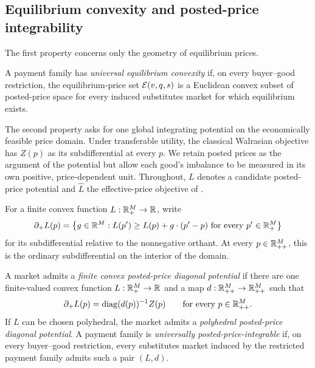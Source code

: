 \subsection{Equilibrium convexity and posted-price integrability}\label{subsec:two-notions}

The first property concerns only the geometry of equilibrium prices.

\begin{definition}\label{def:eq-convexity}
A payment family has \emph{universal equilibrium convexity} if, on every buyer--good restriction, the equilibrium-price set $\mathcal{E}(v,q,s)$ is a Euclidean convex subset of posted-price space for every induced substitutes market for which equilibrium exists.
\end{definition}

The second property asks for one global integrating potential on the economically feasible price domain. Under transferable utility, the classical Walrasian objective has $Z(p)$ as its subdifferential at every $p$. We retain posted prices as the argument of the potential but allow each good's imbalance to be measured in its own positive, price-dependent unit. Throughout, $L$ denotes a candidate posted-price potential and $\widehat L$ the effective-price objective of .

For a finite convex function $L:\mathbb{R}_+^M\to\mathbb{R}$, write
\[
\partial_+L(p)=
\left\{g\in\mathbb{R}^M:
L(p')\ge L(p)+g\cdot(p'-p)
\text{ for every }p'\in\mathbb{R}_+^M
\right\}
\]
for its subdifferential relative to the nonnegative orthant. At every $p\in\mathbb{R}_{++}^M$, this is the ordinary subdifferential on the interior of the domain.

\begin{definition}\label{def:potential}
A market admits a \emph{finite convex posted-price diagonal potential} if there are one finite-valued convex function $L:\mathbb{R}_+^M\to\mathbb{R}$ and a map $d:\mathbb{R}_{++}^M\to\mathbb{R}_{++}^M$ such that
\begin{equation}\label{eq:potential-definition}
\partial_+L(p)=\operatorname{diag}(d(p))^{-1}Z(p)
\qquad\text{for every }p\in\mathbb{R}_{++}^M.
\end{equation}
If $L$ can be chosen polyhedral, the market admits a \emph{polyhedral posted-price diagonal potential}. A payment family is \emph{universally posted-price-integrable} if, on every buyer--good restriction, every substitutes market induced by the restricted payment family admits such a pair $(L,d)$.
\end{definition}


